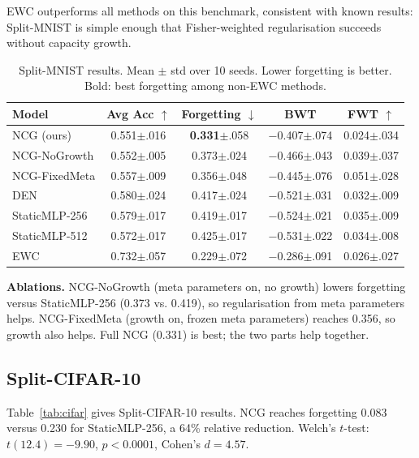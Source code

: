 \documentclass[conference]{IEEEtran}
\begin{document}
EWC outperforms all methods on this benchmark, consistent with known results: Split-MNIST is simple enough that Fisher-weighted regularisation succeeds without capacity growth.

\begin{table}[t]
\centering
\caption{Split-MNIST results. Mean $\pm$ std over 10 seeds. Lower forgetting is better. Bold: best forgetting among non-EWC methods.}
\label{tab:mnist}
\begin{tabular}{lcccc}
\toprule
Model & Avg Acc $\uparrow$ & Forgetting $\downarrow$ & BWT & FWT $\uparrow$ \\
\midrule
NCG (ours) & 0.551{\tiny$\pm$.016} & \textbf{0.331}{\tiny$\pm$.058} & $-$0.407{\tiny$\pm$.074} & 0.024{\tiny$\pm$.034} \\
NCG-NoGrowth & 0.552{\tiny$\pm$.005} & 0.373{\tiny$\pm$.024} & $-$0.466{\tiny$\pm$.043} & 0.039{\tiny$\pm$.037} \\
NCG-FixedMeta & 0.557{\tiny$\pm$.009} & 0.356{\tiny$\pm$.048} & $-$0.445{\tiny$\pm$.076} & 0.051{\tiny$\pm$.028} \\
DEN & 0.580{\tiny$\pm$.024} & 0.417{\tiny$\pm$.024} & $-$0.521{\tiny$\pm$.031} & 0.032{\tiny$\pm$.009} \\
StaticMLP-256 & 0.579{\tiny$\pm$.017} & 0.419{\tiny$\pm$.017} & $-$0.524{\tiny$\pm$.021} & 0.035{\tiny$\pm$.009} \\
StaticMLP-512 & 0.572{\tiny$\pm$.017} & 0.425{\tiny$\pm$.017} & $-$0.531{\tiny$\pm$.022} & 0.034{\tiny$\pm$.008} \\
EWC & 0.732{\tiny$\pm$.057} & 0.229{\tiny$\pm$.072} & $-$0.286{\tiny$\pm$.091} & 0.026{\tiny$\pm$.027} \\
\bottomrule
\end{tabular}
\end{table}

\textbf{Ablations.} NCG-NoGrowth (meta parameters on, no growth) lowers forgetting versus StaticMLP-256 (0.373 vs. 0.419), so regularisation from meta parameters helps. NCG-FixedMeta (growth on, frozen meta parameters) reaches 0.356, so growth also helps. Full NCG (0.331) is best; the two parts help together.

\subsection{Split-CIFAR-10}
Table~\ref{tab:cifar} gives Split-CIFAR-10 results. NCG reaches forgetting 0.083 versus 0.230 for StaticMLP-256, a 64\% relative reduction. Welch's $t$-test: $t(12.4) = -9.90$, $p < 0.0001$, Cohen's $d = 4.57$.
\end{document}

